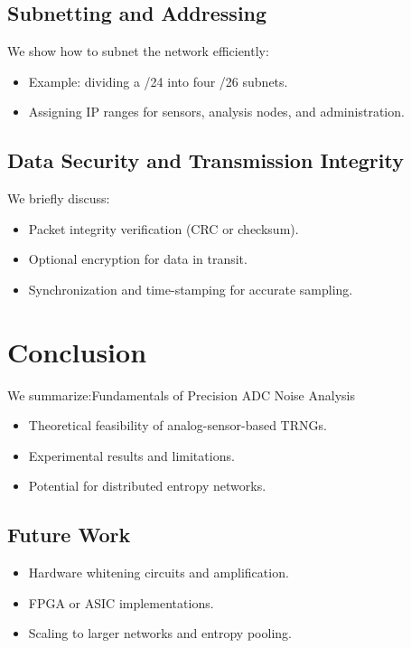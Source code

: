 \subsection{Subnetting and Addressing}
We show how to subnet the network efficiently:
\begin{itemize}
    \item Example: dividing a /24 into four /26 subnets.
    \item Assigning IP ranges for sensors, analysis nodes, and administration.
\end{itemize}

\subsection{Data Security and Transmission Integrity}
We briefly discuss:
\begin{itemize}
    \item Packet integrity verification (CRC or checksum).
    \item Optional encryption for data in transit.
    \item Synchronization and time-stamping for accurate sampling.
\end{itemize}

\newpage
\section{Conclusion}
We summarize:Fundamentals of Precision ADC
Noise Analysis
\begin{itemize}
    \item Theoretical feasibility of analog-sensor-based TRNGs.
    \item Experimental results and limitations.
    \item Potential for distributed entropy networks.
\end{itemize}

\subsection{Future Work}
\begin{itemize}
    \item Hardware whitening circuits and amplification.
    \item FPGA or ASIC implementations.
    \item Scaling to larger networks and entropy pooling.
\end{itemize}

